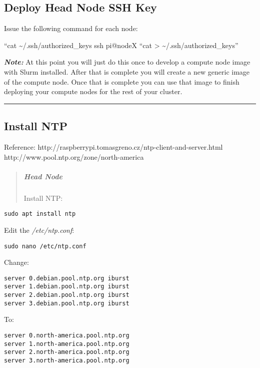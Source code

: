\documentclass[]{article}
\let\oldsubparagraph\subparagraph
\renewcommand{\subparagraph}[1]{\oldsubparagraph{#1}\mbox{}}
\begin{document}
\subsection{Deploy Head Node SSH Key}\label{deploy-head-node-ssh-key}

Issue the following command for each node:

``cat \textasciitilde{}/.ssh/authorized\_keys \textbar{} ssh pi@nodeX
``cat \textgreater{} \textasciitilde{}/.ssh/authorized\_keys''

\emph{\textbf{Note:}} At this point you will just do this once to
develop a compute node image with Slurm installed. After that is
complete you will create a new generic image of the compute node. Once
that is complete you can use that image to finish deploying your compute
nodes for the rest of your cluster.

\begin{center}\rule{0.5\linewidth}{\linethickness}\end{center}

\subsection{Install NTP}\label{install-ntp}

Reference: http://raspberrypi.tomasgreno.cz/ntp-client-and-server.html
http://www.pool.ntp.org/zone/north-america

\begin{quote}
\mbox{}%
\subparagraph{Head Node}\label{head-node-1}

Install NTP:
\end{quote}

\texttt{sudo\ apt\ install\ ntp}

Edit the \emph{/etc/ntp.conf}:

\texttt{sudo\ nano\ /etc/ntp.conf}

Change:

\begin{verbatim}
server 0.debian.pool.ntp.org iburst
server 1.debian.pool.ntp.org iburst
server 2.debian.pool.ntp.org iburst
server 3.debian.pool.ntp.org iburst
\end{verbatim}

To:

\begin{verbatim}
server 0.north-america.pool.ntp.org
server 1.north-america.pool.ntp.org
server 2.north-america.pool.ntp.org
server 3.north-america.pool.ntp.org
\end{verbatim}
\end{document}
